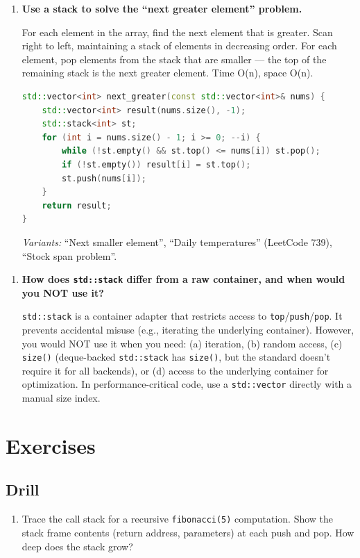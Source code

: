 \begin{enumerate}
\item \textbf{Use a stack to solve the ``next greater element'' problem.}

For each element in the array, find the next element that is greater. Scan right to left, maintaining a stack of elements in decreasing order. For each element, pop elements from the stack that are smaller — the top of the remaining stack is the next greater element. Time O(n), space O(n).

\begin{lstlisting}[language=C++]
std::vector<int> next_greater(const std::vector<int>& nums) {
    std::vector<int> result(nums.size(), -1);
    std::stack<int> st;
    for (int i = nums.size() - 1; i >= 0; --i) {
        while (!st.empty() && st.top() <= nums[i]) st.pop();
        if (!st.empty()) result[i] = st.top();
        st.push(nums[i]);
    }
    return result;
}
\end{lstlisting}

\textit{Variants:} ``Next smaller element'', ``Daily temperatures'' (LeetCode 739), ``Stock span problem''.
\end{enumerate}

\begin{enumerate}
\item \textbf{How does \texttt{std::stack} differ from a raw container, and when would you NOT use it?}

\texttt{std::stack} is a container adapter that restricts access to \texttt{top}/\texttt{push}/\texttt{pop}. It prevents accidental misuse (e.g., iterating the underlying container). However, you would NOT use it when you need: (a) iteration, (b) random access, (c) \texttt{size()} (deque-backed \texttt{std::stack} has \texttt{size()}, but the standard doesn't require it for all backends), or (d) access to the underlying container for optimization. In performance-critical code, use a \texttt{std::vector} directly with a manual size index.
\end{enumerate}

\section{Exercises}

\subsection{Drill}

\begin{enumerate}
\item Trace the call stack for a recursive \texttt{fibonacci(5)} computation. Show the stack frame contents (return address, parameters) at each push and pop. How deep does the stack grow?
\end{enumerate}

